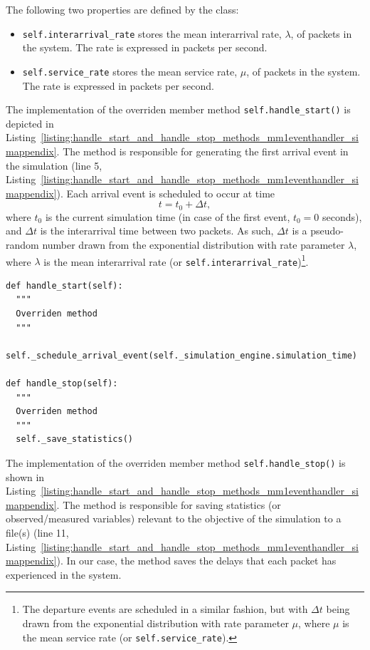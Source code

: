 The following two properties are defined by the class:
\begin{itemize}
  \item \lstinline{self.interarrival_rate} stores the mean interarrival rate, $\lambda$, of packets in the system. The rate is expressed in packets per second.
  \item \lstinline{self.service_rate} stores the mean service rate, $\mu$, of packets in the system. The rate is expressed in packets per second.
\end{itemize}

The implementation of the overriden member method \lstinline{self.handle_start()} is depicted in Listing~\ref{listing:handle_start_and_handle_stop_methods_mm1eventhandler_simappendix}. The method is responsible for generating the first arrival event in the simulation (line 5, Listing~\ref{listing:handle_start_and_handle_stop_methods_mm1eventhandler_simappendix}). Each arrival event is scheduled to occur at time
\begin{equation*}
  t = t_0 + \Delta t,
\end{equation*}
where $t_0$ is the current simulation time (in case of the first event, $t_0=0$ seconds), and $\Delta t$ is the interarrival time between two packets. As such, $\Delta t$ is a pseudo-random number drawn from the exponential distribution with rate parameter $\lambda$, where $\lambda$ is the mean interarrival rate (or \lstinline{self.interarrival_rate})\footnote{The departure events are scheduled in a similar fashion, but with $\Delta t$ being drawn from the exponential distribution with rate parameter $\mu$, where $\mu$ is the mean service rate (or \lstinline{self.service_rate}).}.

\begin{lstlisting}[caption=\lstinline{self.handle_start()} and \lstinline{self.handle_stop()} member methods of the \lstinline{MM1EventHandler} class, label=listing:handle_start_and_handle_stop_methods_mm1eventhandler_simappendix]
def handle_start(self):
  """
  Overriden method
  """
  self._schedule_arrival_event(self._simulation_engine.simulation_time)

def handle_stop(self):
  """
  Overriden method
  """
  self._save_statistics()
\end{lstlisting}

The implementation of the overriden member method \lstinline{self.handle_stop()} is shown in Listing~\ref{listing:handle_start_and_handle_stop_methods_mm1eventhandler_simappendix}. The method is responsible for saving statistics (or observed/measured variables) relevant to the objective of the simulation to a file(s) (line 11, Listing~\ref{listing:handle_start_and_handle_stop_methods_mm1eventhandler_simappendix}). In our case, the method saves the delays that each packet has experienced in the system.

